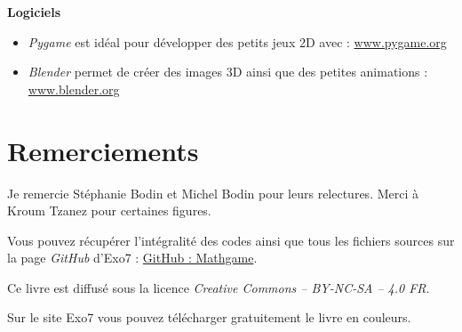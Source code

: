 \smallskip

\textbf{Logiciels}


\begin{itemize}
	\item \emph{Pygame} est idéal pour développer des petits jeux 2D avec \Python{} : \href{https://www.pygame.org/}{www.pygame.org}	
	\item \emph{Blender} permet de créer des images 3D ainsi que des petites animations : \href{https://www.blender.org/}{www.blender.org}
\end{itemize}



\section*{Remerciements}

Je remercie Stéphanie Bodin et Michel Bodin pour leurs relectures. Merci à Kroum Tzanez pour certaines figures.


\bigskip

\begin{center}
Vous pouvez récupérer l'intégralité des codes \Python{} ainsi que tous les fichiers sources sur la page \emph{GitHub} d'Exo7 :
\href{https://github.com/exo7math/mathgame-exo7}{\og{}GitHub : Mathgame\fg{}}.


\end{center}


\vspace*{\fill}

\bigskip 

\begin{center}
\end{center}



\begin{center}
Ce livre est diffusé sous la licence \emph{Creative Commons -- BY-NC-SA -- 4.0 FR}.

Sur le site Exo7 vous pouvez télécharger gratuitement le livre en couleurs.
\end{center}




\printindex
{}

